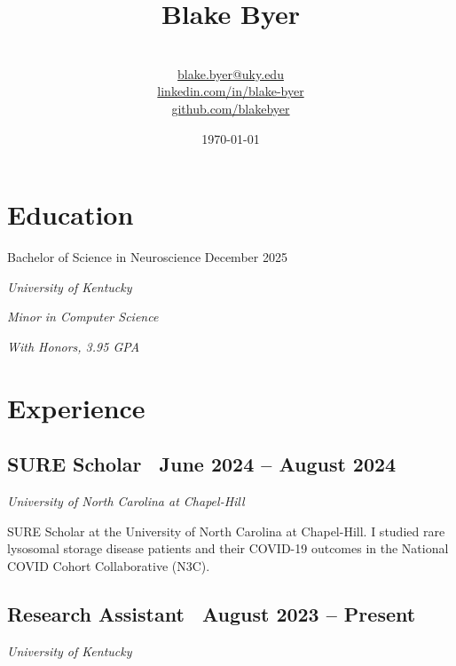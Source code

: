 \documentclass{article}
\begin{document}
\title{\Huge \textbf{Blake Byer} \vspace{-1.25em}}

\author{\\
    \href{mailto:blake.byer@uky.edu}{blake.byer@uky.edu} \\
    \href{https://linkedin.com/in/blake-byer}{linkedin.com/in/blake-byer} \\
    \href{https://github.com/blakebyer}{github.com/blakebyer}
}
\date{\today}
\maketitle

\begin{flushleft}

\section*{Education}

{\large Bachelor of Science in Neuroscience \vspace{0.5em}}\hfill December 2025

\textit{University of Kentucky}

\textit{Minor in Computer Science}

\textit{With Honors, 3.95 GPA}

\section*{Experience}

\subsection*{SURE Scholar {\hfill\normalsize\normalfont\ June 2024 -- August 2024}}
\textit{University of North Carolina at Chapel-Hill \vspace{0.5em}}

SURE Scholar at the University of North Carolina at Chapel-Hill. I studied rare lysosomal storage disease patients
and their COVID-19 outcomes in the National COVID Cohort Collaborative (N3C).

\subsection*{Research Assistant {\hfill\normalsize\normalfont\ August 2023 -- Present}}
\textit{University of Kentucky \vspace{0.5em}}


\end{flushleft}
\end{document}
